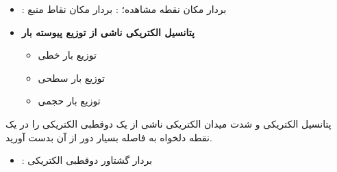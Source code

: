 \begin{ELjoin}

\begin{itemize}
\item
  : بردار مکان نقطه مشاهده؛ : بردار مکان نقاط منبع
\item
  \textbf{پتانسیل الکتریکی ناشی از توزیع پیوسته بار}

  \begin{itemize}
  \item
    توزیع بار خطی
  \item
    توزیع بار سطحی
  \item
    توزیع بار حجمی
  \end{itemize}
\end{itemize}


\begin{ELexample}{}

پتانسیل الکتریکی و شدت میدان الکتریکی ناشی از یک دوقطبی الکتریکی را در یک نقطه دلخواه به فاصله بسیار دور از آن بدست آورید.

\begin{ELsolution}




\begin{itemize}
\tightlist
\item
  : بردار گشتاور دوقطبی الکتریکی
\end{itemize}



\end{ELsolution}
\end{ELexample}
\end{ELjoin}
